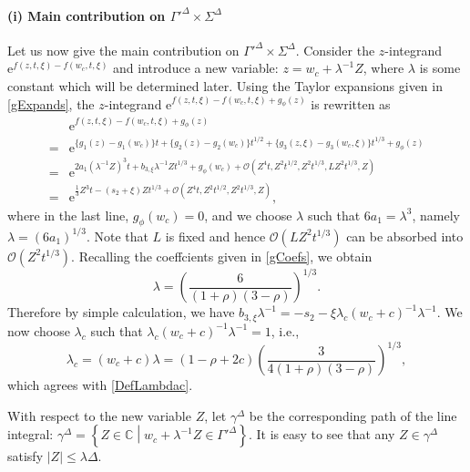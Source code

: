 \documentclass[cmp]{svjour}
\numberwithin{theorem}{section}
\numberwithin{equation}{section}
\begin{document}
\paragraph{(i) Main contribution on $\Gamma'^{\Delta} \times \Sigma^{\Delta}$}Let us now give the main contribution on $\Gamma'^{\Delta} \times \Sigma^{\Delta}$. Consider the $z$-integrand $\mathrm{e}^{ f(z, t,\xi) - f(w_c , t, \xi) }$ and introduce a new variable: $z  = w_c +  \lambda^{-1} Z$, where $\lambda$ is some constant which will be determined later. Using the Taylor expansions given in \eqref{gExpands}, the $z$-integrand $\mathrm{e}^{ f(z, t,\xi) - f(w_c , t, \xi) + g_{\phi}(z) }$ is rewritten as 
\begin{equation}\label{Zintegrand}
	\begin{split}
		& \mathrm{e}^{ f(z, t,\xi) - f(w_c , t, \xi) + g_{\phi}(z) } \\
		= &  \mathrm{e}^{ \{ g_1(z) - g_1(w_c) \} t + \{ g_2(z) - g_2(w_c) \} t^{1/2} + \{ g_3(z , \xi) - g_3(w_c , \xi) \} t^{1/3} + g_{\phi}(z) } \\
		= & \mathrm{e}^{ 2 a_1 {(\lambda^{-1} Z)}^3 t + b_{3,\xi} \lambda^{-1} Z t^{1/3} + g_{\phi}(w_c) + \mathcal{O}( Z^4 t , Z^2 t^{1/2} , Z^2 t^{1/3} , LZ^2t^{1/3} , Z ) } \\
		= & \mathrm{e}^{ \frac{1}{3} Z^3 t - (s_2 + \xi) Z t^{1/3}  + \mathcal{O}( Z^4 t , Z^2 t^{1/2} , Z^2 t^{1/3} , Z ) },
	\end{split}
\end{equation}
where in the last line, $g_{\phi}(w_c)=0$, and we choose $\lambda$ such that $6a_1=\lambda^3$, namely $\lambda=(6a_1)^{1/3}$. Note that $L$ is fixed and hence $\mathcal{O}(LZ^2t^{1/3})$ can be absorbed into $\mathcal{O}(Z^2t^{1/3})$. Recalling the coeffcients given in \eqref{gCoefs}, we obtain 
\begin{equation}
	\lambda = {\left( \frac{6}{(1 + \rho)(3 - \rho)} \right)}^{1/3}.
\end{equation}
Therefore by simple calculation, we have $b_{3,\xi} \lambda^{-1} = - s_2 - \xi \lambda_c (w_c + c)^{-1} \lambda^{-1}$. We now choose $\lambda_c$ such that $\lambda_c (w_c + c)^{-1} \lambda^{-1}=1$, i.e., 
\begin{equation*}
	\lambda_c = (w_c + c) \lambda = (1 - \rho + 2c ) {\left( \frac{3}{4 (1 + \rho) (3 - \rho)} \right)}^{1/3} ,
\end{equation*}
which agrees with \eqref{DefLambdac}.




With respect to the new variable $Z$, let $\gamma^{\Delta} $ be the corresponding path of the line integral: $
\gamma^{\Delta} = \left\{ Z \in \mathbb{C} \middle| w_c + \lambda^{-1} Z \in \Gamma'^{\Delta}  \right\}$.
It is easy to see that any $Z \in \gamma^{\Delta}$  satisfy $ |Z|   \leq \lambda \Delta $.
\end{document}

